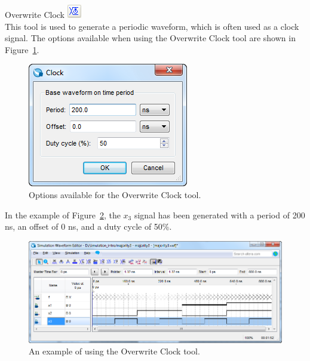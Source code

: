 \documentclass[11pt, twoside, pdftex]{article}
\begin{document}
\begin{description}
	\item {\sf Overwrite Clock} \hbox{\includegraphics[scale=0.7]{figures/appendix/icon11.png}}\\
	This tool is used to generate a periodic waveform, which is often used as a clock signal. 
	The options available when using the {\sf Overwrite Clock} tool are shown in Figure~\ref{fig:fig12}. 
	\begin{figure}[H]
	   \begin{center}
	      \includegraphics[scale=0.65]{figures/appendix/figure12.png}
	   \caption{Options available for the {\sf Overwrite Clock} tool.} 
		 \label{fig:fig12}
		 \end{center}
	\end{figure}
	
	In the example of Figure~\ref{fig:fig13}, the $x_3$ signal has been generated with a period of 200 ns, 
	an offset of 0 ns, and a duty cycle of 50\%. 
	\begin{figure}[H]
	   \begin{center}
	      \includegraphics[scale=0.65]{figures/appendix/figure13.png}
	   \caption{An example of using the {\sf Overwrite Clock} tool.} 
		 \label{fig:fig13}
		 \end{center}
	\end{figure}


\end{description}
\end{document}
